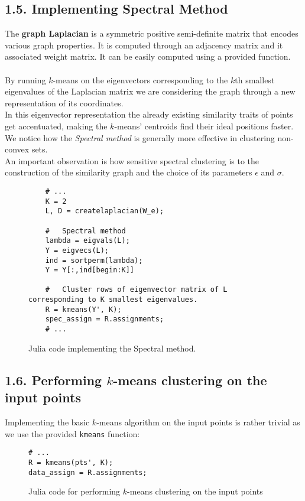 \documentclass[unicode,11pt,a4paper,oneside,numbers=endperiod,openany]{scrartcl}
\begin{document}
\subsection*{1.5. Implementing Spectral Method}
The \textbf{graph Laplacian} is a symmetric positive semi-definite matrix that encodes various graph properties. It is computed through an adjacency matrix and it associated weight matrix. It can be easily computed using a provided function.\\\\
By running $k$-means on the eigenvectors corresponding to the $k$th smallest eigenvalues of the Laplacian matrix we are considering the graph through a new representation of its coordinates.\\
In this eigenvector representation the already existing similarity traits of points get accentuated, making the $k$-means' centroids find their ideal positions faster. We notice how the \textit{Spectral method} is generally more effective in clustering non-convex sets.\\
An important observation is how sensitive spectral clustering is to the construction of the similarity graph and the choice of its parameters $\epsilon$ and $\sigma$.\\
\begin{figure}[h!]
\begin{verbatim}
    # ...
    K = 2
    L, D = createlaplacian(W_e);

    #   Spectral method
    lambda = eigvals(L);
    Y = eigvecs(L);
    ind = sortperm(lambda);
    Y = Y[:,ind[begin:K]]

    #   Cluster rows of eigenvector matrix of L corresponding to K smallest eigenvalues.
    R = kmeans(Y', K);
    spec_assign = R.assignments;
    # ...
\end{verbatim}
\caption{Julia code implementing the Spectral method.}
\end{figure}
\clearpage
\subsection*{1.6. Performing $k$-means clustering on the input points}
Implementing the basic $k$-means algorithm on the input points is rather trivial as we use the provided \verb|kmeans| function:
\begin{figure}[h!]
\begin{verbatim}
# ...
R = kmeans(pts', K);
data_assign = R.assignments;
\end{verbatim}
\caption{Julia code for performing $k$-means clustering on the input points}
\end{figure}
\end{document}
